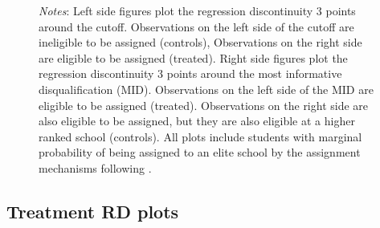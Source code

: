 \documentclass[oneside,11pt]{article}
\begin{document}
\begin{figure}[H]
\footnotesize
\textit{Notes}: Left side figures plot the regression discontinuity 3 points around the cutoff. Observations on the left side of the cutoff are ineligible to be assigned (controls), Observations on the right side are eligible to be assigned (treated). Right side figures plot the regression discontinuity 3 points around the most informative disqualification (MID). Observations on the left side of the MID are eligible to be assigned (treated). Observations on the right side are also eligible to be assigned, but they are also eligible at a higher ranked school (controls). All plots include students with marginal probability of being assigned to an elite school by the assignment mechanisms following \citet{abdulkadirouglu2022breaking}. 
\end{figure}

\subsection{Treatment RD plots}
\end{document}
